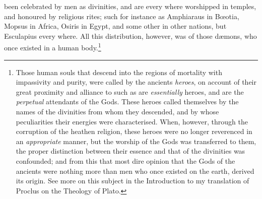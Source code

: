 \documentclass{article}
\begin{document}
been celebrated by men as divinities, and are every where worshipped in
temples, and honoured by religious rites; such for instance as Amphiaraus in
B{\oe}otia, Mopsus in Africa, Osiris in Egypt, and some other in other nations,
but Esculapius every where. All this distribution, however, was of those
d{\ae}mons, who once existed in a human body.\footnote{Those human souls that
descend into the regions of mortality with impassivity and purity, were called
by the ancients \textit{heroes}, on account of their great proximity and
alliance to such as are \textit{essentially} heroes, and are the
\textit{perpetual} attendants of the Gods. These heroes called themselves by
the names of the divinities from whom they descended, and by whose
peculiarities their energies were characterised. When, however, through the
corruption of the heathen religion, these heroes were no longer reverenced in
an \textit{appropriate} manner, but the worship of the Gods was transferred to
them, the proper distinction between their essence and that of the divinities
was confounded; and from this that most dire opinion that the Gods of the
ancients were nothing more than men who once existed on the earth, derived its
origin. See more on this subject in the Introduction to my translation of
Proclus on the Theology of Plato.}
\end{document}
